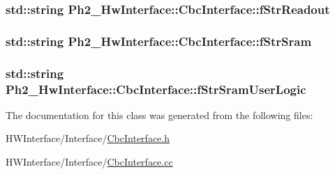 \hypertarget{class_ph2___hw_interface_1_1_cbc_interface_ade4f2642613500ee5f1963c22509c48b}{
\subsubsection[{f\-Str\-Readout}]{\setlength{\rightskip}{0pt plus 5cm}std\-::string Ph2\-\_\-\-Hw\-Interface\-::\-Cbc\-Interface\-::f\-Str\-Readout\hspace{0.3cm}{\ttfamily [private]}}}\label{class_ph2___hw_interface_1_1_cbc_interface_ade4f2642613500ee5f1963c22509c48b}
\hypertarget{class_ph2___hw_interface_1_1_cbc_interface_aaddc36b6ef3360c0a99da44c53a3242f}{
\subsubsection[{f\-Str\-Sram}]{\setlength{\rightskip}{0pt plus 5cm}std\-::string Ph2\-\_\-\-Hw\-Interface\-::\-Cbc\-Interface\-::f\-Str\-Sram\hspace{0.3cm}{\ttfamily [private]}}}\label{class_ph2___hw_interface_1_1_cbc_interface_aaddc36b6ef3360c0a99da44c53a3242f}
\hypertarget{class_ph2___hw_interface_1_1_cbc_interface_a61c9447688cc556e33d7051c26459755}{
\subsubsection[{f\-Str\-Sram\-User\-Logic}]{\setlength{\rightskip}{0pt plus 5cm}std\-::string Ph2\-\_\-\-Hw\-Interface\-::\-Cbc\-Interface\-::f\-Str\-Sram\-User\-Logic\hspace{0.3cm}{\ttfamily [private]}}}\label{class_ph2___hw_interface_1_1_cbc_interface_a61c9447688cc556e33d7051c26459755}


The documentation for this class was generated from the following files\-:\begin{DoxyCompactItemize}
\item 
H\-W\-Interface/\-Interface/\hyperlink{_cbc_interface_8h}{Cbc\-Interface.\-h}\item 
H\-W\-Interface/\-Interface/\hyperlink{_cbc_interface_8cc}{Cbc\-Interface.\-cc}\end{DoxyCompactItemize}
